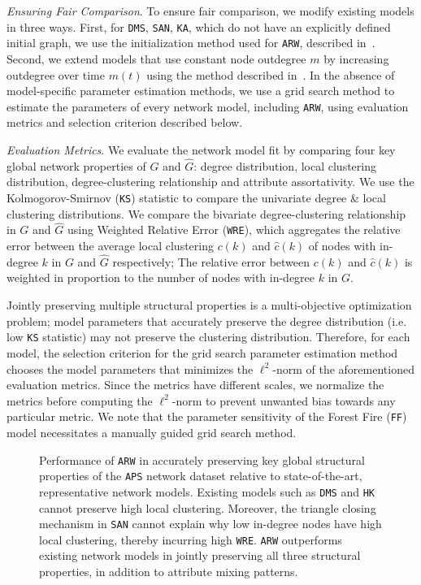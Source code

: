 \textit{Ensuring Fair Comparison}. To ensure fair comparison, we modify existing models in three ways.
First, for \texttt{DMS}, \texttt{SAN}, \texttt{KA}, which do not have an explicitly defined initial graph,
we use the initialization method used for \texttt{ARW}, described in~. Second, we extend
models that use constant node outdegree $m$ by increasing outdegree over time $m(t)$
using the method described in~. In the absence of model-specific parameter estimation methods,
we use a grid search method to estimate the parameters of every network model, including \texttt{ARW},
using evaluation metrics and selection criterion described below.

\textit{Evaluation Metrics}.
We evaluate the network model fit by comparing four key global network properties of ${G}$ and $\hat{G}$:
degree distribution, local clustering distribution, degree-clustering relationship
and attribute assortativity. We use the Kolmogorov-Smirnov (\texttt{KS}) statistic to compare the univariate degree
\& local clustering distributions. We compare the bivariate degree-clustering relationship in $G$ and $\hat{G}$ using
Weighted Relative Error (\texttt{WRE}), which aggregates the relative error
between the average local clustering $c(k)$ and $\hat{c}(k)$ of nodes with in-degree $k$
in $G$ and $\hat{G}$ respectively; The relative error between $c(k)$ and $\hat{c}(k)$
is weighted in proportion to the number of nodes with in-degree $k$ in $G$.

Jointly preserving multiple structural properties is a multi-objective optimization
problem; model parameters that accurately preserve the degree distribution
(i.e. low \texttt{KS} statistic) may not preserve the clustering distribution.
Therefore, for each model, the selection criterion for the grid search parameter estimation method
chooses the model parameters that minimizes the $\ell^2$-norm of the aforementioned evaluation metrics.
Since the metrics have different scales, we normalize the metrics before computing the $\ell^2$-norm
to prevent unwanted bias towards any particular metric.
We note that the parameter sensitivity of the Forest Fire (\texttt{FF}) model necessitates
a manually guided grid search method.

\begin{figure*}[b]
	\centering
	\caption{
		Performance of \texttt{ARW} in accurately preserving key global structural properties
		of the \texttt{APS} network dataset relative to state-of-the-art, representative
		network models. Existing models such as \texttt{DMS} and \texttt{HK} cannot preserve high
		local clustering.
		Moreover, the triangle closing mechanism in \texttt{SAN} cannot explain why low in-degree nodes have high local clustering, thereby incurring high
		\texttt{WRE}. \texttt{ARW} outperforms existing network models
		in jointly preserving all three structural properties, in addition to attribute mixing patterns.}
	\label{fig:aps_fits}
\end{figure*}

